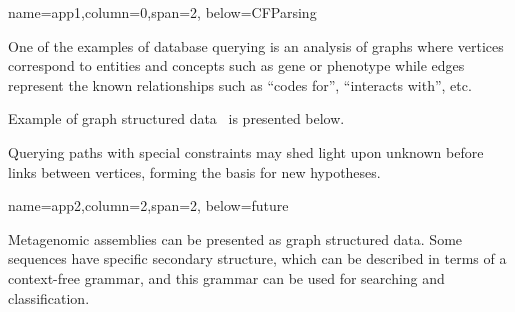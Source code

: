 \documentclass[a0paper,portrait]{baposter}
\begin{document}
\begin{poster}

{name=app1,column=0,span=2, below=CFParsing}
{ %
One of the examples of database querying is an analysis of graphs where vertices correspond to entities and concepts such as gene or phenotype while edges represent the known relationships such as ``codes for'', ``interacts with'', etc.

Example of graph structured data~\cite{Earley} is presented below.

Querying paths with special constraints may shed light upon unknown before links between vertices, forming the basis for new hypotheses.
}


{name=app2,column=2,span=2, below=future}
{
Metagenomic assemblies can be presented as graph structured data.
Some sequences have specific secondary structure, which can be described in terms of a context-free grammar, and this grammar can be used for searching and classification.

}




\end{poster}
\end{document}
